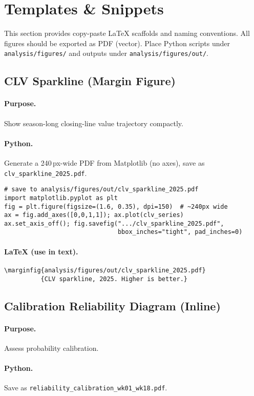 \section{Templates \& Snippets}
This section provides copy-paste LaTeX scaffolds and naming conventions. All figures should be exported as PDF (vector). Place Python scripts under \texttt{analysis/figures/} and outputs under \texttt{analysis/figures/out/}.

\subsection{CLV Sparkline (Margin Figure)}
\paragraph{Purpose.} Show season-long closing-line value trajectory compactly.
\paragraph{Python.} Generate a 240\,px-wide PDF from Matplotlib (no axes), save as \texttt{clv\_sparkline\_2025.pdf}.
\begin{verbatim}
# save to analysis/figures/out/clv_sparkline_2025.pdf
import matplotlib.pyplot as plt
fig = plt.figure(figsize=(1.6, 0.35), dpi=150)  # ~240px wide
ax = fig.add_axes([0,0,1,1]); ax.plot(clv_series)
ax.set_axis_off(); fig.savefig(".../clv_sparkline_2025.pdf",
                               bbox_inches="tight", pad_inches=0)
\end{verbatim}
\paragraph{LaTeX (use in text).}
\begin{verbatim}
\marginfig{analysis/figures/out/clv_sparkline_2025.pdf}
          {CLV sparkline, 2025. Higher is better.}
\end{verbatim}

\subsection{Calibration Reliability Diagram (Inline)}
\paragraph{Purpose.} Assess probability calibration.
\paragraph{Python.} Save as \texttt{reliability\_calibration\_wk01\_wk18.pdf}.
